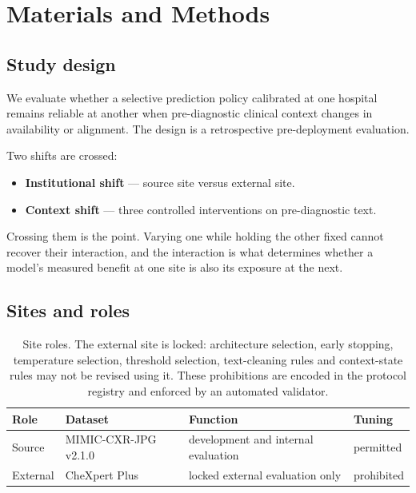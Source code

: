 \section{Materials and Methods}
\label{sec:methods}

\subsection{Study design}

We evaluate whether a selective prediction policy calibrated at one hospital
remains reliable at another when pre-diagnostic clinical context changes in
availability or alignment. The design is a retrospective pre-deployment
evaluation.

Two shifts are crossed:

\begin{itemize}
  \item \textbf{Institutional shift} --- source site versus external site.
  \item \textbf{Context shift} --- three controlled interventions on
    pre-diagnostic text.
\end{itemize}

Crossing them is the point. Varying one while holding the other fixed cannot
recover their interaction, and the interaction is what determines whether a
model's measured benefit at one site is also its exposure at the next.

\subsection{Sites and roles}

\begin{table}[htbp]
\centering
\caption{Site roles. The external site is locked: architecture selection, early
stopping, temperature selection, threshold selection, text-cleaning rules and
context-state rules may not be revised using it. These prohibitions are encoded
in the protocol registry and enforced by an automated validator.}
\label{tab:sites}
\begin{tabular}{llll}
\toprule
Role & Dataset & Function & Tuning \\
\midrule
Source   & MIMIC-CXR-JPG v2.1.0~\cite{johnson2019mimiccxr}
         & development and internal evaluation & permitted \\
External & CheXpert Plus~\cite{chexpertplus2024}
         & locked external evaluation only & prohibited \\
\bottomrule
\end{tabular}
\end{table}

